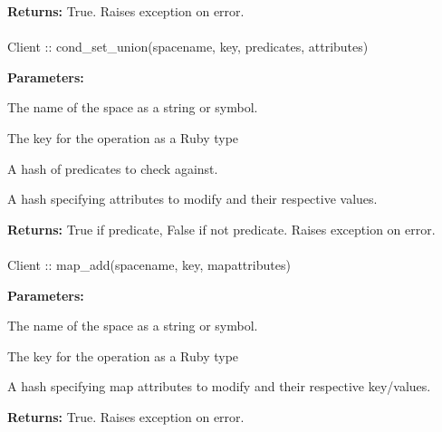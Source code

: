 \noindent\textbf{Returns:}
True.  Raises exception on error.

\paragraph{}
\label{api:ruby:cond_set_union}
\begin{rubycode}
Client :: cond_set_union(spacename, key, predicates, attributes)
\end{rubycode}


\noindent\textbf{Parameters:}
\begin{description}[labelindent=\widthof{{\code{predicates}}},leftmargin=*,noitemsep,nolistsep,align=right]
\item[\code{spacename}] The name of the space as a string or symbol.
\item[\code{key}] The key for the operation as a Ruby type
\item[\code{predicates}] A hash of predicates to check against.
\item[\code{attributes}] A hash specifying attributes to modify and their respective values.
\end{description}

\noindent\textbf{Returns:}
True if predicate, False if not predicate.  Raises exception on error.

\paragraph{}
\label{api:ruby:map_add}
\begin{rubycode}
Client :: map_add(spacename, key, mapattributes)
\end{rubycode}


\noindent\textbf{Parameters:}
\begin{description}[labelindent=\widthof{{\code{mapattributes}}},leftmargin=*,noitemsep,nolistsep,align=right]
\item[\code{spacename}] The name of the space as a string or symbol.
\item[\code{key}] The key for the operation as a Ruby type
\item[\code{mapattributes}] A hash specifying map attributes to modify and their respective key/values.
\end{description}

\noindent\textbf{Returns:}
True.  Raises exception on error.

